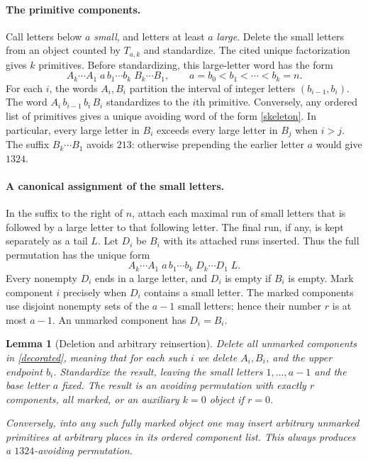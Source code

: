 \documentclass[11pt]{article}
\newtheorem{lemma}{Lemma}
\begin{document}
\paragraph{The primitive components.}
Call letters below $a$ \emph{small}, and letters at least $a$
\emph{large}. Delete the small letters from an object counted by
$T_{a,k}$ and standardize. The cited unique factorization gives
$k$ primitives. Before standardizing, this large-letter word has
the form
\begin{equation}\label{skeleton}
 A_k\cdots A_1\;a\,b_1\cdots b_k\;B_k\cdots B_1,
 \qquad a=b_0<b_1<\cdots<b_k=n.
\end{equation}
For each $i$, the words $A_i,B_i$ partition the interval of integer
letters $(b_{i-1},b_i)$. The word
$A_i\,b_{i-1}\,b_i\,B_i$ standardizes to the $i$th primitive.
Conversely, any ordered list of primitives gives a unique avoiding
word of the form \eqref{skeleton}. In particular, every large
letter in $B_i$ exceeds every large letter in $B_j$ when $i>j$.
The suffix $B_k\cdots B_1$ avoids $213$: otherwise prepending the
earlier letter $a$ would give $1324$.

\paragraph{A canonical assignment of the small letters.}
In the suffix to the right of $n$, attach each maximal run of small
letters that is followed by a large letter to that following letter.
The final run, if any, is kept separately as a tail $L$.
Let $D_i$ be $B_i$ with its attached runs inserted. Thus the full
permutation has the unique form
\begin{equation}\label{decorated}
 A_k\cdots A_1\;a\,b_1\cdots b_k\;D_k\cdots D_1\;L.
\end{equation}
Every nonempty $D_i$ ends in a large letter, and $D_i$ is empty
if $B_i$ is empty. Mark component $i$ precisely when $D_i$ contains
a small letter. The marked components use disjoint nonempty sets
of the $a-1$ small letters; hence their number $r$ is at most $a-1$.
An unmarked component has $D_i=B_i$.

\begin{lemma}[Deletion and arbitrary reinsertion]\label{insertion}
Delete all unmarked components in \eqref{decorated}, meaning that
for each such $i$ we delete $A_i,B_i$, and the upper endpoint $b_i$.
Standardize the result, leaving the small letters $1,\ldots,a-1$
and the base letter $a$ fixed. The result is an avoiding permutation
with exactly $r$ components, all marked, or an auxiliary $k=0$
object if $r=0$.

Conversely, into any such fully marked object one may insert
arbitrary unmarked primitives at arbitrary places in its ordered
component list. This always produces a $1324$-avoiding permutation.
\end{lemma}
\end{document}
